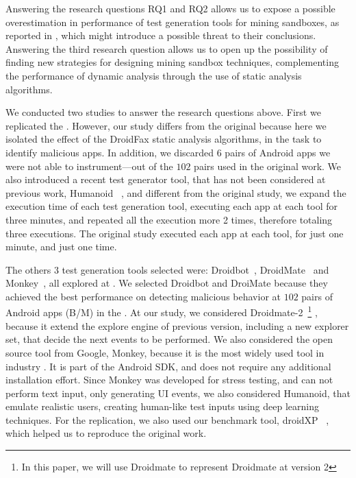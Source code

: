 Answering the research questions RQ1 and RQ2 allows us to expose a possible overestimation in performance of test generation tools for mining sandboxes,
as reported in \blls, which might introduce a possible threat to their conclusions. Answering the third research question
allows us to open up the possibility of finding new strategies for designing mining sandbox techniques, complementing the performance of
dynamic analysis through the use of static analysis algorithms.

We conducted two studies to answer the research questions above. First we replicated the \blls. However, our study differs from the original because here we isolated the effect of the DroidFax static analysis algorithms, in the task to identify malicious apps. In addition, we discarded $6$ pairs of
Android apps we were not able to instrument---out of the $102$ pairs used in the original work. We also introduced a recent test generator tool, that has not been considered at previous work, Humanoid ~\cite{DBLP:conf/kbse/LiY0C19}, and different from the original study, we expand the execution time of each test generation tool, executing each app at each tool for three minutes, and repeated all the execution more 2 times, therefore totaling three executions. The original study executed each app at each tool, for just one minute, and just one time.

The others $3$ test generation tools selected were: Droidbot~\cite{DBLP:conf/icse/LiYGC17},
DroidMate~\cite{DBLP:conf/icse/JamrozikZ16} and Monkey~\cite{Monkey}, all explored at \blls. We selected Droidbot and DroiMate because they achieved
the best performance on detecting malicious behavior at $102$ pairs of Android apps (B/M) in the \blls. At our study, we considered Droidmate-2~\footnote{In this paper, we will use Droidmate to represent Droidmate at version 2} \cite{DBLP:conf/kbse/BorgesHZ18}, because it extend the explore engine of previous version, including a new explorer set, that decide the next events to be performed. We also considered the open source tool from Google, Monkey, because it is the most widely used tool in industry \cite{DBLP:conf/sigsoft/ZengLZXDLYX16}. It is part of the Android SDK, and does not require any additional installation effort. Since Monkey was developed for stress testing, and can not perform text input, only generating
UI events, we also considered Humanoid, that emulate realistic users, creating human-like test inputs using deep learning techniques.
For the replication, we also used our benchmark tool, droidXP ~\cite{DBLP:conf/scam/CostaMCMVBC20},
which helped us to reproduce the original work.

